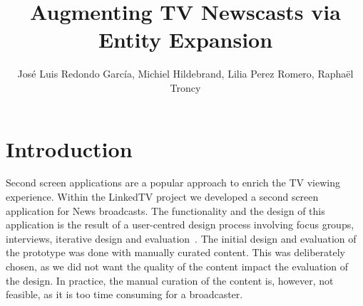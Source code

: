 \documentclass{llncs}
\begin{document}
\frontmatter          %
\pagestyle{headings}  %
\mainmatter              %

\title{Augmenting TV Newscasts via Entity Expansion}
\author{Jos\'e Luis Redondo Garc\'ia, Michiel Hildebrand, Lilia Perez Romero, Rapha\"el Troncy}


\maketitle              %


%


\section{Introduction}
Second screen applications are a popular approach to enrich the TV viewing experience. Within the LinkedTV project we developed a second screen application for News broadcasts. The functionality and the design of this application is the result of a user-centred design process involving focus groups, interviews, iterative design and evaluation~\cite{lilia2013}. The initial design and evaluation of the prototype was done with manually curated content. This was deliberately chosen, as we did not want the quality of the content impact the evaluation of the design. In practice, the manual curation of the content is, however, not feasible, as it is too time consuming for a broadcaster.
\end{document}
